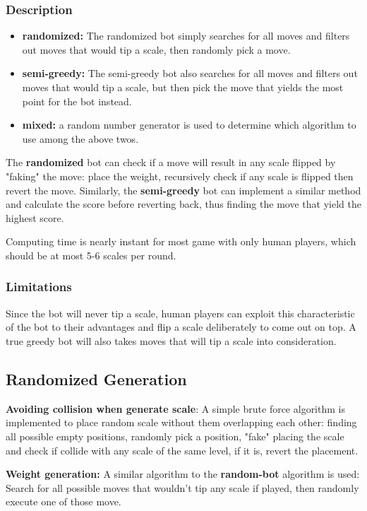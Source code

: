 \documentclass[12pt]{article}
\begin{document}
\subsubsection{Description}
\begin{itemize}
  \item \textbf{randomized:} The randomized bot simply searches for all moves
    and filters out moves that would tip a scale, then randomly pick a move.
  \item \textbf{semi-greedy:} The semi-greedy bot also searches for all moves
    and filters out moves that would tip a scale, but then pick the move that
    yields the most point for the bot instead.
  \item \textbf{mixed:} a random number generator is used to determine which
    algorithm to use among the above twos.
\end{itemize}
The \textbf{randomized} bot can check if a move will result in any scale flipped
by "faking" the move: place the weight, recursively check if any scale is
flipped then revert the move. Similarly, the \textbf{semi-greedy} bot can
implement a similar method and calculate the score before reverting back, thus
finding the move that yield the highest score.

Computing time is nearly instant for most game with only human players, which
should be at most 5-6 scales per round. 

\subsubsection{Limitations}
Since the bot will never tip a scale, human players can exploit this
characteristic of the bot to their advantages and flip a scale deliberately to
come out on top. A true greedy bot will also takes moves that will tip a scale
into consideration.

\subsection{Randomized Generation}

\textbf{Avoiding collision when generate scale}: 
A simple brute force algorithm is implemented to place random scale without them
overlapping each other: finding all possible empty positions, randomly pick a
position, "fake" placing the scale and check if collide with any scale of the
same level, if it is, revert the placement.

\textbf{Weight generation:} 
A similar algorithm to the \textbf{random-bot} algorithm is used: Search for
all possible moves that wouldn't tip any scale if played, then randomly execute
one of those move.
\end{document}
